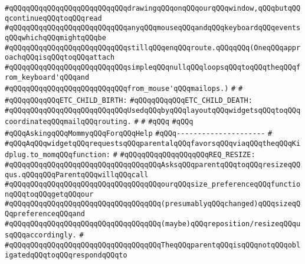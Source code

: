 \verb|#qQQqqQQqqQQqqQQqqQQqqQQqqQQqdrawingqQQqonqQQqourqQQqwindow,qQQqbutqQQqcontinueqQQqtoqQQqread|\newline
\verb|#qQQqqQQqqQQqqQQqqQQqqQQqqQQqanyqQQqmouseqQQqandqQQqkeyboardqQQqeventsqQQqwhichqQQqmightqQQqbe|\newline
\verb|#qQQqqQQqqQQqqQQqqQQqqQQqqQQqstillqQQqenqQQqroute.qQQqqQQq(OneqQQqapproachqQQqisqQQqtoqQQqattach|\newline
\verb|#qQQqqQQqqQQqqQQqqQQqqQQqqQQqsimpleqQQqnullqQQqloopsqQQqtoqQQqtheqQQqfrom_keyboard'qQQqand|\newline
\verb|#qQQqqQQqqQQqqQQqqQQqqQQqqQQqfrom_mouse'qQQqmailops.)|\newline
\verb|#|\newline
\verb|#|\newline
\verb|#qQQqqQQqqQQqETC_CHILD_BIRTH:|\newline
\verb|#qQQqqQQqqQQqETC_CHILD_DEATH:|\newline
\verb|#qQQqqQQqqQQqqQQqqQQqqQQqqQQqUsedqQQqbyqQQqlayoutqQQqwidgetsqQQqtoqQQqcoordinateqQQqmailqQQqrouting.|\newline
\verb|#|\newline
\verb|#|\newline
\verb|#qQQq|\newline
\verb|#qQQq|\newline
\verb|#qQQqAskingqQQqMommyqQQqForqQQqHelp|\newline
\verb|#qQQq---------------------|\newline
\verb|#|\newline
\verb|#qQQqAqQQqwidgetqQQqrequestsqQQqparentalqQQqfavorsqQQqviaqQQqtheqQQqKidplug.to_momqQQqfunction:|\newline
\verb|#|\newline
\verb|#qQQqqQQqqQQqqQQqqQQqREQ_RESIZE:|\newline
\verb|#qQQqqQQqqQQqqQQqqQQqqQQqqQQqqQQqqQQqAsksqQQqparentqQQqtoqQQqresizeqQQqus.qQQqqQQqParentqQQqwillqQQqcall|\newline
\verb|#qQQqqQQqqQQqqQQqqQQqqQQqqQQqqQQqqQQqourqQQqsize_preferenceqQQqfunctionqQQqtoqQQqgetqQQqour|\newline
\verb|#qQQqqQQqqQQqqQQqqQQqqQQqqQQqqQQqqQQq(presumablyqQQqchanged)qQQqsizeqQQqpreferenceqQQqand|\newline
\verb|#qQQqqQQqqQQqqQQqqQQqqQQqqQQqqQQqqQQq(maybe)qQQqreposition/resizeqQQqusqQQqaccordingly.|\newline
\verb|#|\newline
\verb|#qQQqqQQqqQQqqQQqqQQqqQQqqQQqqQQqqQQqTheqQQqparentqQQqisqQQqnotqQQqobligatedqQQqtoqQQqrespondqQQqto|\newline
